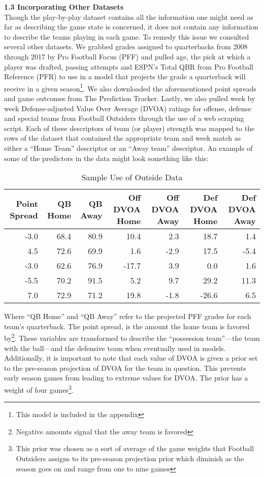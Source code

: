 \documentclass[12pt,twoside]{dukestatscithesis}
\begin{document}
\textbf{1.3 Incorporating Other Datasets}\\
Though the play-by-play dataset contains all the information one might need as far as describing the game state is concerned, it does not contain any information to describe the teams playing in each game. To remedy this issue we consulted several other datasets. We grabbed grades assigned to quarterbacks from 2008 through 2017 by Pro Football Focus (PFF) and pulled age, the pick at which a player was drafted, passing attempts and ESPN's Total QBR from Pro Football Reference (PFR) to use in a model that projects the grade a quarterback will receive in a given season\footnote{This model is included in the appendix}. We also downloaded the aforementioned point spreads and game outcomes from The Prediction Tracker. Lastly, we also pulled week by week Defense-adjusted Value Over Average (DVOA) ratings for offense, defense and special teams from Football Outsiders through the use of a web scraping script. Each of these descriptors of team (or player) strength was mapped to the rows of the dataset that contained the appropriate team and week match as either a ``Home Team'' descriptor or an ``Away team'' descriptor. An example of some of the predictors in the data might look something like this:
\begin{longtable}[t]{rrrrrrr}
\caption{\label{tab:sample-data}Sample Use of Outside Data}\\
\toprule
Point Spread & QB Home & QB Away & Off DVOA Home & Off DVOA Away & Def DVOA Home & Def DVOA Away\\
\midrule
-3.0 & 68.4 & 80.9 & 10.4 & 2.3 & 18.7 & 1.4\\
4.5 & 72.6 & 69.9 & 1.6 & -2.9 & 17.5 & -5.4\\
-3.0 & 62.6 & 76.9 & -17.7 & 3.9 & 0.0 & 1.6\\
-5.5 & 70.2 & 91.5 & 5.2 & 9.7 & 29.2 & 11.3\\
7.0 & 72.9 & 71.2 & 19.8 & -1.8 & -26.6 & 6.5\\
\bottomrule
\end{longtable}
Where ``QB Home'' and ``QB Away'' refer to the projected PFF grades for each team's quarterback. The point spread, is the amount the home team is favored by\footnote{Negative amounts signal that the away team is favored}. These variables are transformed to describe the ``possession team''---the team with the ball---and the defensive team when eventually used in models. Additionally, it is important to note that each value of DVOA is given a prior set to the pre-season projection of DVOA for the team in question. This prevents early season games from leading to extreme values for DVOA. The prior has a weight of four games\footnote{This prior was chosen as a sort of average of the game weights that Football Outsiders assigns to its pre-season projection prior which diminish as the season goes on and range from one to nine games}.
\end{document}
